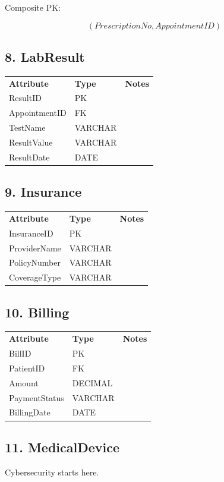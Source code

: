 Composite PK:

\[(PrescriptionNo, AppointmentID)\]

\subsection*{8. LabResult}
\begin{tabular}{lll}
\textbf{Attribute} & \textbf{Type} & \textbf{Notes} \\
ResultID & PK &  \\
AppointmentID & FK &  \\
TestName & VARCHAR &  \\
ResultValue & VARCHAR &  \\
ResultDate & DATE &  \\
\end{tabular}

\subsection*{9. Insurance}
\begin{tabular}{lll}
\textbf{Attribute} & \textbf{Type} & \textbf{Notes} \\
InsuranceID & PK &  \\
ProviderName & VARCHAR &  \\
PolicyNumber & VARCHAR &  \\
CoverageType & VARCHAR &  \\
\end{tabular}

\subsection*{10. Billing}
\begin{tabular}{lll}
\textbf{Attribute} & \textbf{Type} & \textbf{Notes} \\
BillID & PK &  \\
PatientID & FK &  \\
Amount & DECIMAL &  \\
PaymentStatus & VARCHAR &  \\
BillingDate & DATE &  \\
\end{tabular}

\subsection*{11. MedicalDevice}

Cybersecurity starts here.

